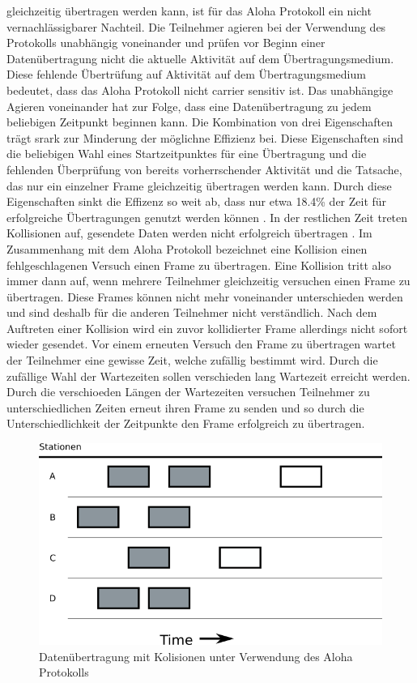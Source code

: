 gleichzeitig übertragen werden kann, ist für das Aloha Protokoll ein nicht vernachlässigbarer Nachteil. Die Teilnehmer agieren bei der Verwendung des Protokolls unabhängig voneinander und prüfen vor Beginn einer Datenübertragung nicht die aktuelle Aktivität auf dem Übertragungsmedium. Diese fehlende Übertrüfung auf Aktivität auf dem Übertragungsmedium bedeutet, dass das Aloha Protokoll nicht carrier sensitiv ist. Das unabhängige Agieren voneinander hat zur Folge, dass eine Datenübertragung zu jedem beliebigen Zeitpunkt beginnen kann. Die Kombination von drei Eigenschaften trägt srark zur Minderung der möglichne Effizienz bei. Diese Eigenschaften sind die beliebigen Wahl eines Startzeitpunktes für eine Übertragung und die fehlenden Überprüfung von bereits vorherrschender Aktivität und die Tatsache, das nur ein einzelner Frame gleichzeitig übertragen werden kann. Durch diese Eigenschaften sinkt die Effizenz so weit ab, dass nur etwa 18.4\% der Zeit für erfolgreiche Übertragungen genutzt werden können \cite{Back_AlohaPure}. In der restlichen Zeit treten Kollisionen auf, gesendete Daten werden nicht erfolgreich übertragen \cite{Back_AlohaPure}. Im Zusammenhang mit dem Aloha Protokoll bezeichnet eine Kollision einen fehlgeschlagenen Versuch einen Frame zu übertragen. Eine Kollision tritt also immer dann auf, wenn mehrere Teilnehmer gleichzeitig versuchen einen Frame zu übertragen. Diese Frames können nicht mehr voneinander unterschieden werden und sind deshalb für die anderen Teilnehmer nicht verständlich. Nach dem Auftreten einer Kollision wird ein zuvor kollidierter Frame allerdings nicht sofort wieder gesendet. Vor einem erneuten Versuch den Frame zu übertragen wartet der Teilnehmer eine gewisse Zeit, welche zufällig bestimmt wird. Durch die zufällige Wahl der Wartezeiten sollen verschieden lang Wartezeit erreicht werden. Durch die verschioeden Längen der Wartezeiten versuchen Teilnehmer zu unterschiedlichen Zeiten erneut ihren Frame zu senden und so durch die Unterschiedlichkeit der Zeitpunkte den Frame erfolgreich zu übertragen.
\begin{figure}[h!]
	\begin{center}
	\includegraphics[scale=0.6]{img/ZeichnungExport2.png}
	\caption{Datenübertragung mit Kolisionen unter Verwendung des Aloha Protokolls}
	\end{center}
	\label{Abb2_PureAloha}
\end{figure}

